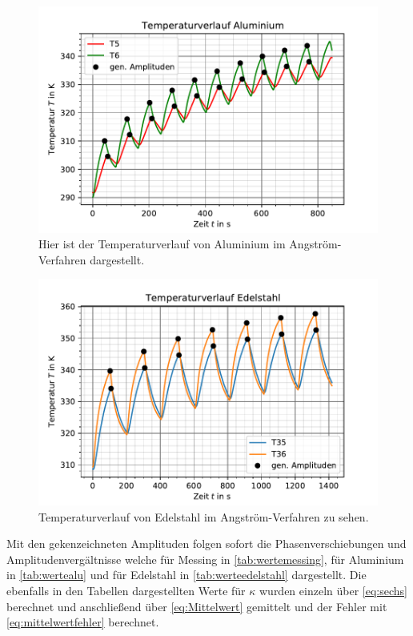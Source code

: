   \begin{figure}
    \centering
    \includegraphics{wellenalu.pdf}
    \caption{Hier ist der Temperaturverlauf von Aluminium im Angström-Verfahren dargestellt.}
    \label{fig:aluwelle}
  \end{figure}

  \begin{figure}
    \centering
    \includegraphics{welleedelstahl.pdf}
    \caption{Temperaturverlauf von Edelstahl im Angström-Verfahren zu sehen.}
    \label{fig:edelwelle}
  \end{figure}



  Mit den gekenzeichneten Amplituden folgen sofort die Phasenverschiebungen und Amplitudenvergältnisse
  welche für Messing in \autoref{tab:wertemessing}, für Aluminium in \autoref{tab:wertealu} und für 
  Edelstahl in \autoref{tab:werteedelstahl} dargestellt. Die ebenfalls in den Tabellen dargestellten
  Werte für $\kappa$ wurden einzeln über \autoref{eq:sechs} berechnet und anschließend über \autoref{eq:Mittelwert} gemittelt
  und der Fehler mit \autoref{eq:mittelwertfehler} berechnet.


